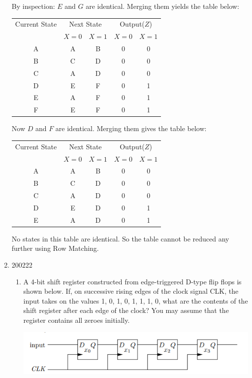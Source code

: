 \documentclass[10pt,\jkfside,a4paper]{article}
\begin{document}
\begin{enumerate}
By inspection: $E$ and $G$ are identical. Merging them yields the table below:

\begin{tabular}{c|c c|c c}
Current State & \multicolumn{2}{|c|}{Next State} & \multicolumn{2}{c}{Output($Z$)}\\
  & $X=0$ & $X=1$ & $X=0$ & $X=1$\\
\hline
A & A & B & 0 & 0\\
B & C & D & 0 & 0\\
C & A & D & 0 & 0\\
D & E & F & 0 & 1\\
E & A & F & 0 & 1\\
F & E & F & 0 & 1\\
\end{tabular}

Now $D$ and $F$ are identical. Merging them gives the table below:

\begin{tabular}{c|c c|c c}
Current State & \multicolumn{2}{|c|}{Next State} & \multicolumn{2}{c}{Output($Z$)}\\
  & $X=0$ & $X=1$ & $X=0$ & $X=1$\\
\hline
A & A & B & 0 & 0\\
B & C & D & 0 & 0\\
C & A & D & 0 & 0\\
D & E & D & 0 & 1\\
E & A & D & 0 & 1\\
\end{tabular}

No states in this table are identical. 
So the table cannot be reduced any further using Row Matching.

\item
\begin{examquestion}{2002}{2}{2}

\begin{enumerate}[label=(\alph*)]

\item{A 4-bit shift register constructed from edge-triggered D-type flip flops is shown
below. If, on successive rising edges of the clock signal CLK, the input takes
on the values 1, 0, 1, 0, 1, 1, 1, 0, what are the contents of the shift register after
each edge of the clock? You may assume that the register contains all zeroes
initially.}

\begin{center}
\includegraphics{5a}
\end{center}


\end{enumerate}
\end{examquestion}
\end{enumerate}
\end{document}
